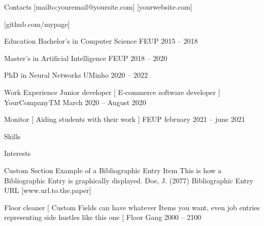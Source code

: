 \begin{mainpane}

	\begin{mainsection}{Contacts}
		[mailto:youremail@yoursite.com]
		[yourwebsite.com]

		[github.com/mypage]
	\end{mainsection}

	\begin{mainsection}{Education}
			\entryJob
            {Bachelor's in Computer Science}
            {FEUP}
            {2015 -- 2018}

			\entryJob
            {Master's in Artificial Intelligence}
            {FEUP}
            {2018 -- 2020}

			\entryJob
            {PhD in Neural Networks}
            {UMinho}
            {2020 -- 2022}
	\end{mainsection}

	\begin{mainsection}{Work Experience}
			\entryJob
            {Junior developer }
			[ E-commerce software developer ]
            {YourCompanyTM}
            {March 2020 -- August 2020}

			\entryJob
            {Monitor }
			[ Aiding students with their work ]
            {FEUP}
            {february 2021 -- june 2021}
	\end{mainsection}

	\begin{mainsection}{Skills}
	\end{mainsection}

	\begin{mainsection}{Interests}





	\end{mainsection}

	\begin{mainsection}{Custom Section}
			 \entryPub
            {Example of a Bibliographic Entry Item}
            {This is how a Bibliographic Entry is graphically displayed.}
            {Doe, J. (2077)}
            {Bibliographic Entry URL}
            [www.url.to.the.paper]
			

			\entryJob
            {Floor cleaner }
			[ Custom Fields can have whatever Items you want, even job entries representing side hustles like this one ]
            {Floor Gang}
            {2000 -- 2100}
			
	\end{mainsection}
\end{mainpane}




